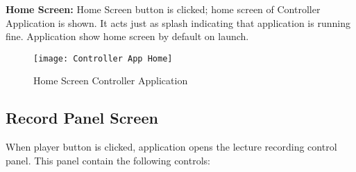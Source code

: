 \textbf{Home Screen:} Home Screen button is clicked; home screen of Controller Application is shown. It acts just as splash indicating that application is running fine. Application show home screen by default on launch.

\begin{figure}[h]
  \centering
  \texttt{[image: Controller App Home]}
  \caption{Home Screen Controller Application}
\end{figure}

\subsection{Record Panel Screen}
When player button is clicked, application opens the lecture recording control panel. This panel contain the following controls:

